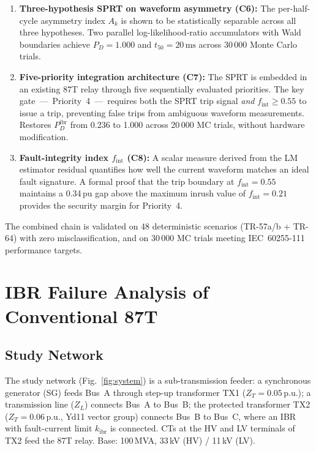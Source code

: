 \documentclass[journal,twoside,10pt]{IEEEtran}
\newcommand{\kibr}{k_{\mathrm{ibr}}}
\newcommand{\pu}{\,\text{p.u.}}
\newcommand{\ms}{\,\text{ms}}
\newcommand{\fint}{f_{\mathrm{int}}}
\newcommand{\Ak}{A_k}
\newcommand{\Pdibr}{P_D^{\mathrm{ibr}}}
\begin{document}
\begin{enumerate}
  \item \textbf{Three-hypothesis SPRT on waveform asymmetry (C6):}
        The per-half-cycle asymmetry index $\Ak$ is shown to be statistically
        separable across all three hypotheses.
        Two parallel log-likelihood-ratio accumulators with Wald boundaries
        achieve $P_D = 1.000$ and $t_{50} = 20\ms$ across 30\,000
        Monte Carlo trials.

  \item \textbf{Five-priority integration architecture (C7):}
        The SPRT is embedded in an existing 87T relay through five sequentially
        evaluated priorities.
        The key gate~---~Priority~4~---~requires both the SPRT trip signal
        \emph{and} $\fint \geq 0.55$ to issue a trip, preventing false
        trips from ambiguous waveform measurements.
        Restores $\Pdibr$ from 0.236 to 1.000 across 20\,000 MC trials,
        without hardware modification.

  \item \textbf{Fault-integrity index $\fint$ (C8):}
        A scalar measure derived from the LM estimator residual quantifies
        how well the current waveform matches an ideal fault signature.
        A formal proof that the trip boundary at $\fint = 0.55$ maintains
        a 0.34\,pu gap above the maximum inrush value of $\fint = 0.21$
        provides the security margin for Priority~4.
\end{enumerate}

The combined chain is validated on 48 deterministic scenarios
(TR-57a/b + TR-64) with zero misclassification, and on 30\,000 MC trials
meeting IEC~60255-111 performance targets.

\section{IBR Failure Analysis of Conventional 87T}
\label{sec:failure}

\subsection{Study Network}
\label{sec:network}

The study network (Fig.~\ref{fig:system}) is a sub-transmission feeder:
a synchronous generator (SG) feeds Bus~A through step-up transformer TX1
($Z_T = 0.05\pu$); a transmission line ($Z_L$) connects Bus~A to Bus~B;
the protected transformer TX2 ($Z_T = 0.06\pu$, Yd11 vector group)
connects Bus~B to Bus~C, where an IBR with fault-current limit $\kibr$ is
connected.
CTs at the HV and LV terminals of TX2 feed the 87T relay.
Base: 100\,MVA, 33\,kV (HV) / 11\,kV (LV).
\end{document}
